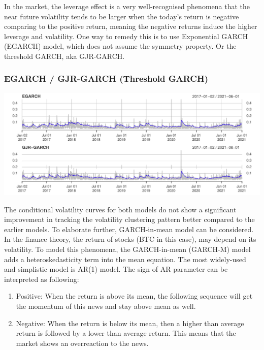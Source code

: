 \documentclass[
  11pt,
]{article}
\providecommand{\tightlist}{%
  \setlength{\itemsep}{0pt}\setlength{\parskip}{0pt}}
\begin{document}
In the market, the leverage effect is a very well-recognised phenomena
that the near future volatility tends to be larger when the today's
return is negative comparing to the positive return, meaning the
negative returns induce the higher leverage and volatility. One way to
remedy this is to use Exponential GARCH (EGARCH) model, which does not
assume the symmetry property. Or the threshold GARCH, aka GJR-GARCH.

\hypertarget{egarch-gjr-garch-threshold-garch}{%
\subsubsection{EGARCH / GJR-GARCH (Threshold
GARCH)}\label{egarch-gjr-garch-threshold-garch}}

\includegraphics{ST436_Project_files/figure-latex/unnamed-chunk-25-1.pdf}

The conditional volatility curves for both models do not show a
significant improvement in tracking the volatility clustering pattern
better compared to the earlier models. To elaborate further,
GARCH-in-mean model can be considered. In the finance theory, the return
of stocks (BTC in this case), may depend on its volatility. To model
this phenomena, the GARCH-in-mean (GARCH-M) model adds a
heteroskedasticity term into the mean equation. The most widely-used and
simplistic model is AR(1) model. The sign of AR parameter can be
interpreted as following:

\begin{enumerate}
\def\labelenumi{\arabic{enumi}.}
\tightlist
\item
  Positive: When the return is above its mean, the following sequence
  will get the momentum of this news and stay above mean as well.
\item
  Negative: When the return is below its mean, then a higher than
  average return is followed by a lower than average return. This means
  that the market shows an overreaction to the news.
\end{enumerate}
\end{document}
